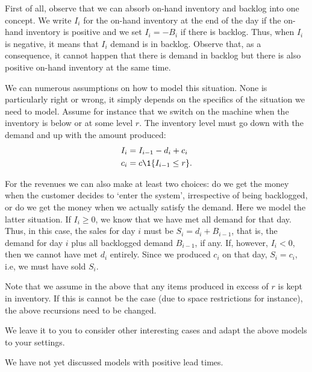   \begin{solution}
    First of all, observe that we can absorb on-hand inventory and
    backlog into one concept. We write $I_i$ for the on-hand inventory
    at the end of the day if the on-hand inventory is positive and we
    set $I_i=-B_i$ if there is backlog. Thus, when $I_i$ is negative,
    it means that $I_i$ demand is in backlog.  Observe that, as a
    consequence, it cannot happen that there is demand in backlog but
    there is also positive on-hand inventory at the same time.

    We can numerous assumptions on how to model this situation. None
    is particularly right or wrong, it simply depends on the specifics
    of the situation we need to model. Assume for instance that we
    switch on the machine when the inventory is below or at some level
    $r$. The inventory level must go down with the demand and up with
    the amount produced:
    \begin{align*}
      I_i &= I_{i-1}-d_i + c_i \\
c_i &= c \1{I_{i-1} \leq r}.
    \end{align*}

    For the revenues we can also make at least two choices: do we get
    the money when the customer decides to `enter the system',
    irrespective of being backlogged, or do we get the money when we
    actually satisfy the demand. Here we model the latter situation.
    If $I_i\geq 0$, we know that we have met all demand for that
    day. Thus, in this case, the sales for day $i$ must be
    $S_i = d_i+B_{i-1}$, that is, the demand for day $i$ plus all
    backlogged demand $B_{i-1}$, if any. If, however, $I_i <0$, then
    we cannot have met $d_i$ entirely. Since we produced $c_i$ on that
    day, $S_i = c_i$, i.e, we must have sold $S_i$. 

    Note that we assume in the above that any items produced in excess
    of $r$ is kept in inventory. If this is cannot be the case (due to
    space restrictions for instance), the above recursions need to be
    changed.

    We leave it to you to consider other interesting cases and adapt
    the above models to your settings.

  \end{solution}

\begin{question}[use=false]
  We have not yet discussed models with positive lead times. 
\end{question}


